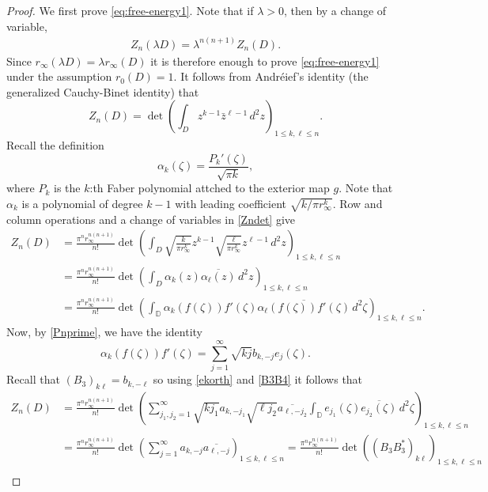 \documentclass{article}
\numberwithin{equation}{section}
\numberwithin{figure}{section}
\theoremstyle{plain}
\theoremstyle{plain}
\numberwithin{thm}{section}
\theoremstyle{remark}
\newcommand{\D}{\mathbb{D}}
\let \le \leqslant
\begin{document}
    \begin{proof}
    We first prove \eqref{eq:free-energy1}. Note that if $\lambda >0$, then by a change of variable,
    \begin{align}\label{eq:scaling-Z}
    Z_n(\lambda D) = \lambda^{n(n+1)}Z_n(D).
        \end{align}
Since $r_\infty(\lambda D) = \lambda r_\infty(D)$ it is therefore enough to prove \eqref{eq:free-energy1} under the assumption $r_0(D) = 1$.
    It follows from Andr\'eief's identity (the generalized Cauchy-Binet identity) that 
\begin{equation}\label{Zndet}
Z_n(D)=\det\left(\int_D z^{k-1}\bar{z}^{\ell-1}\,d^2z\right)_{1\le k,\ell\le n}.
\end{equation}
Recall the definition
\begin{equation*}
\alpha_k(\zeta)=\frac{P_k'(\zeta)}{\sqrt{\pi k}},
\end{equation*}
where $P_k$ is the $k$:th Faber polynomial attched to the exterior map $g$. Note that $\alpha_k$ is a polynomial of degree $k-1$ with leading coefficient $\sqrt{k/\pi r_\infty^k}$. Row and column operations and a change of variables in \eqref{Zndet} give
\begin{align*}
Z_n(D)&=\frac{\pi^n r_\infty^{n(n+1)}}{n!}\det\left(\int_D \sqrt{\frac k{\pi r_\infty^k}}z^{k-1}\sqrt{\frac \ell{\pi r_\infty^k}}z^{\ell-1}\,d^2z\right)_{1\le k,\ell\le n} \\
&=
\frac{\pi^n r_\infty^{n(n+1)}}{n!}\det\left(\int_D\alpha_k(z)\overline{\alpha_\ell(z)}\,d^2z\right)_{1\le k,\ell\le n}\\
&=\frac{\pi^n r_\infty^{n(n+1)}}{n!}\det\left(\int_\D\alpha_k(f(\zeta))f'(\zeta)\overline{\alpha_\ell(f(\zeta))f'(\zeta)}\,d^2\zeta\right)_{1\le k,\ell\le n}.
\end{align*}
Now, by \eqref{Pnprime}, we have the identity
\begin{equation*}
\alpha_k(f(\zeta))f'(\zeta)=\sum_{j=1}^\infty\sqrt{kj}b_{k,-j}e_j(\zeta).
\end{equation*}
Recall that $(B_3)_{k\ell} = b_{k, -\ell}$ so using \eqref{ekorth} and \eqref{B3B4} it follows that
\begin{align*}
Z_n(D)&=\frac{\pi^n r_\infty^{n(n+1)} }{n!}\det\left(\sum_{j_1,j_2=1}^\infty \sqrt{kj_1}a_{k,-j_1}\sqrt{\ell j_2}\overline{a_{\ell,-j_2}}\int_\D e_{j_1}(\zeta)\overline{e_{j_2}(\zeta)}\,d^2\zeta\right)_{1\le k,\ell\le n}\\
&=\frac{\pi^n r_\infty^{n(n+1)} }{n!}\det\left(\sum_{j=1}^\infty a_{k,-j}\overline{a_{\ell,-j}}\right)_{1\le k,\ell\le n}=\frac{\pi^nr_\infty^{n(n+1)}}{n!}\det\left((B_3B_3^*)_{k\ell}\right)_{1\le k,\ell\le n}\\

\end{align*}
\end{proof}
\end{document}
